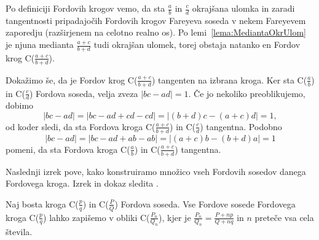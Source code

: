 \documentclass[mat1]{fmfdelo}
\begin{document}
\begin{dokaz}
Po definiciji Fordovih krogov vemo, da sta $\frac{a}{b}$ in $\frac{c}{d}$ okrajšana ulomka in zaradi tangentnosti pripadajočih Fordovih krogov Fareyeva soseda v nekem Fareyevem zaporedju (razširjenem na celotno realno os). Po lemi~\ref{lema:MediantaOkrUlom} je njuna medianta $\frac{a+c}{b+d}$ tudi okrajšan ulomek, torej obstaja natanko en Fordov krog C($\frac{a+c}{b+d}$). 

Dokažimo še, da je Fordov krog C($\frac{a+c}{b+d}$) tangenten na izbrana kroga. Ker sta C($\frac{a}{b}$) in C($\frac{c}{d}$) Fordova soseda, velja zveza 
\( |bc-ad|=1. \)
Če jo nekoliko preoblikujemo, dobimo
\[ |bc-ad|=|bc-ad+cd-cd|=|(b+d)c-(a+c)d|=1, \]
od koder sledi, da sta Fordova kroga C($\frac{a+c}{b+d}$) in C($\frac{c}{d}$) tangentna.
Podobno
\[ |bc-ad|=|bc-ad+ab-ab|=|(a+c)b-(b+d)a|=1 \]
pomeni, da sta Fordova kroga C($\frac{a}{b}$) in C($\frac{a+c}{b+d}$) tangentna.
\end{dokaz}

Naslednji izrek pove, kako konstruiramo množico vseh Fordovih sosedov danega Fordovega kroga. Izrek in dokaz sledita \cite[poglavje 2, Theorem 3, str.~588--589]{ford}.

\begin{izrek}
Naj bosta kroga C($\frac{p}{q}$) in C($\frac{P}{Q}$) Fordova soseda. Vse Fordove sosede Fordovega kroga C($\frac{p}{q}$) lahko zapišemo v obliki C($\frac{P_n}{Q_n}$), kjer je $\frac{P_n}{Q_n} = \frac{P+np}{Q+nq}$ in $n$ preteče vsa cela števila.
\end{izrek}
\end{document}
